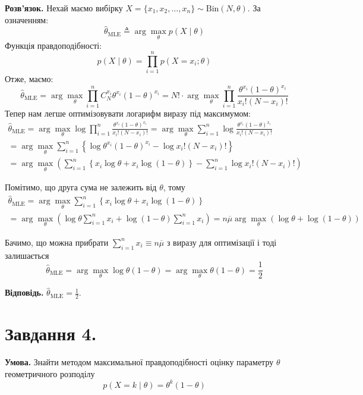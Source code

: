 \documentclass[14pt]{extarticle}
\begin{document}
\textbf{Розв'язок.} Нехай маємо вибірку $X=\{x_1,x_2,\dots,x_n\} \sim \text{Bin}(N,\theta)$. За означенням:
\[
\hat{\theta}_{\text{MLE}} \triangleq \arg\max_{\theta} p(X \mid \theta)
\]
Функція правдоподібності:
\[
p(X \mid \theta) = \prod_{i=1}^n p(X=x_i;\theta)
\]
Отже, маємо:
\[
\hat{\theta}_{\text{MLE}} = \arg\max_{\theta} \prod_{i=1}^n C_N^{x_i} \theta^{x_i}(1-\theta)^{x_i} = N! \cdot \arg\max_{\theta}\prod_{i=1}^n \frac{\theta^{x_i}(1-\theta)^{x_i}}{x_i!(N-x_i)!}
\]
Тепер нам легше оптимізовувати логарифм виразу під максимумом:
\begin{gather*}
\hat{\theta}_{\text{MLE}} = \arg\max_{\theta}\log\prod_{i=1}^n \frac{\theta^{x_i}(1-\theta)^{x_i}}{x_i!(N-x_i)!} = \arg\max_{\theta}\sum_{i=1}^n \log \frac{\theta^{x_i}(1-\theta)^{x_i}}{x_i!(N-x_i)!} \\
= \arg\max_{\theta} \sum_{i=1}^n \left\{ \log \theta^{x_i}(1-\theta)^{x_i} - \log x_i!(N-x_i)!\right\} \\
= \arg\max_{\theta} \left(\sum_{i=1}^n \left\{x_i\log\theta + x_i\log(1-\theta)\right\} - \sum_{i=1}^n \log x_i!(N-x_i)!\right)
\end{gather*}

Помітимо, що друга сума не залежить від $\theta$, тому
\begin{gather*}
\hat{\theta}_{\text{MLE}} = \arg\max_{\theta} \sum_{i=1}^n\left\{ x_i\log\theta + x_i \log(1-\theta)\right\}\\ = \arg\max_{\theta}\left(\log\theta \sum_{i=1}^n x_i + \log(1-\theta)\sum_{i=1}^n x_i\right) = n\overline{\mu}\arg\max_{\theta}(\log \theta + \log(1-\theta))
\end{gather*}

Бачимо, що можна прибрати $\sum_{i=1}^n x_i \equiv n\overline{\mu}$ з виразу для оптимізації і тоді залишається
\[
\hat{\theta}_{\text{MLE}} = \arg\max_{\theta} \log \theta(1-\theta) = \arg\max_{\theta} \theta(1-\theta) = \frac{1}{2}
\]

\textbf{Відповідь.} $\hat{\theta}_{\text{MLE}} = \frac{1}{2}$.

\section*{Завдання 4.}

\textbf{Умова.} Знайти методом максимальної правдоподібності оцінку параметру $\theta$ геометричного розподілу
\[
p(X=k\mid\theta) = \theta^k(1-\theta)
\]
\end{document}
